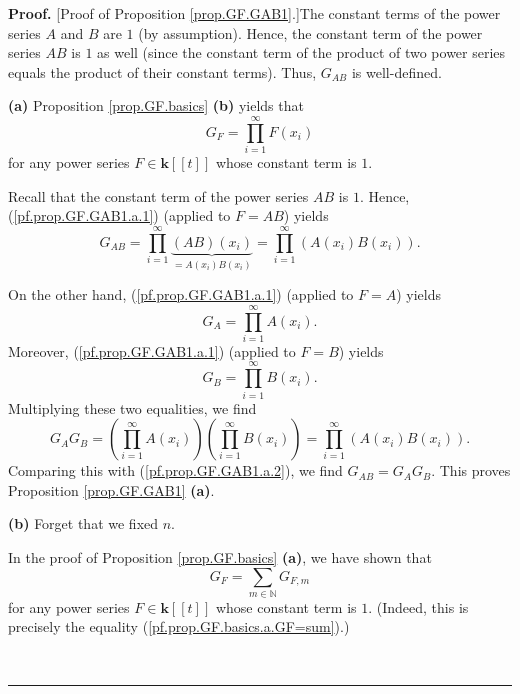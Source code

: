 \documentclass[numbers=enddot,12pt,final,onecolumn,notitlepage]{scrartcl}%
\theoremstyle{definition}
\newenvironment{proof}[1][Proof]{\noindent\textbf{#1.} }{\ \rule{0.5em}{0.5em}}
\let\sumnonlimits\sum
\let\prodnonlimits\prod
\renewcommand{\sum}{\sumnonlimits\limits}
\renewcommand{\prod}{\prodnonlimits\limits}
\newenvironment{verlong}{}{}
\begin{document}
\begin{verlong}
\begin{proof}
[Proof of Proposition \ref{prop.GF.GAB1}.]The constant terms of the power
series $A$ and $B$ are $1$ (by assumption). Hence, the constant term of the
power series $AB$ is $1$ as well (since the constant term of the product of
two power series equals the product of their constant terms). Thus, $G_{AB}$
is well-defined.

\textbf{(a)} Proposition \ref{prop.GF.basics} \textbf{(b)} yields that%
\begin{equation}
G_{F}=\prod_{i=1}^{\infty}F\left(  x_{i}\right)  \label{pf.prop.GF.GAB1.a.1}%
\end{equation}
for any power series $F\in\mathbf{k}\left[  \left[  t\right]  \right]  $ whose
constant term is $1$.

Recall that the constant term of the power series $AB$ is $1$. Hence,
(\ref{pf.prop.GF.GAB1.a.1}) (applied to $F=AB$) yields%
\begin{equation}
G_{AB}=\prod_{i=1}^{\infty}\underbrace{\left(  AB\right)  \left(
x_{i}\right)  }_{=A\left(  x_{i}\right)  B\left(  x_{i}\right)  }=\prod
_{i=1}^{\infty}\left(  A\left(  x_{i}\right)  B\left(  x_{i}\right)  \right)
. \label{pf.prop.GF.GAB1.a.2}%
\end{equation}


On the other hand, (\ref{pf.prop.GF.GAB1.a.1}) (applied to $F=A$) yields%
\[
G_{A}=\prod_{i=1}^{\infty}A\left(  x_{i}\right)  .
\]
Moreover, (\ref{pf.prop.GF.GAB1.a.1}) (applied to $F=B$) yields%
\[
G_{B}=\prod_{i=1}^{\infty}B\left(  x_{i}\right)  .
\]
Multiplying these two equalities, we find%
\[
G_{A}G_{B}=\left(  \prod_{i=1}^{\infty}A\left(  x_{i}\right)  \right)  \left(
\prod_{i=1}^{\infty}B\left(  x_{i}\right)  \right)  =\prod_{i=1}^{\infty
}\left(  A\left(  x_{i}\right)  B\left(  x_{i}\right)  \right)  .
\]
Comparing this with (\ref{pf.prop.GF.GAB1.a.2}), we find $G_{AB}=G_{A}G_{B}$.
This proves Proposition \ref{prop.GF.GAB1} \textbf{(a)}.

\textbf{(b)} Forget that we fixed $n$.

In the proof of Proposition \ref{prop.GF.basics} \textbf{(a)}, we have shown
that%
\begin{equation}
G_{F}=\sum_{m\in\mathbb{N}}G_{F,m} \label{pf.prop.GF.GAB1.b.1}%
\end{equation}
for any power series $F\in\mathbf{k}\left[  \left[  t\right]  \right]  $ whose
constant term is $1$. (Indeed, this is precisely the equality
(\ref{pf.prop.GF.basics.a.GF=sum}).)


\end{proof}
\end{verlong}
\end{document}
